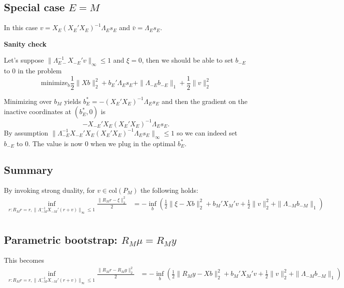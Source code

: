 \documentclass{article}
\begin{document}
          \subsection{          Special case $E=M$ }

          In this case $v=X_E(X_E'X_E)^{-1}\Lambda_Es_E$ and $\bar{v}=\Lambda_Es_E$.

          {\bf Sanity check}

          Let's suppose $\|\Lambda_{E-}^{-1}X_{-E}'v\|_{\infty} \leq 1$ and $\xi=0$, then we should be able to set $b_{-E}$ to 0 in the problem
          $$
          \text{minimize}_b \frac{1}{2} \|Xb\|^2_2 + b_E'\Lambda_Es_E + \|\Lambda_{-E}b_{-E}\|_1 + \frac{1}{2} \|v\|^2_2
          $$

          Minimizing over $b_M$ yields $b_E^* =-(X_E'X_E)^{-1}\Lambda_Es_E$ and then the gradient
          on the inactive coordinates at $(b_E^*, 0)$ is
          $$
          -X_{-E}'X_E(X_E'X_E)^{-1}\Lambda_Es_E.
          $$
          By assumption $\|\Lambda_{-E}^{-1}X_{-E}'X_E(X_E'X_E)^{-1}\Lambda_Es_E\|_{\infty} \leq 1$ so we can indeed set $b_{-E}$ to 0.
          The value is now 0 when we plug in the optimal $b_E^*$.

          \subsection{Summary}

          By invoking strong duality, for $v \in \text{col}(P_M)$ the following holds:
          $$
          \begin{aligned}
          \inf_{r: R_Mr=r,  \|\Lambda_{-M}^{-1}X_{-M}'(r + v)\|_{\infty}
            \leq 1} \frac{\|R_Mr - \xi\|^2_2}{2} &= -\inf_b \left(\frac{1}{2} \|\xi - Xb\|^2_2 + b_M'X_M'v + \frac{1}{2} \|v\|^2_2  + \|\Lambda_{-M}b_{-M}\|_1\right)\\
          \end{aligned}
          $$

          \subsection{Parametric bootstrap: $R_M\mu=R_My$}

          This becomes
          $$
          \begin{aligned}
          \inf_{r: R_Mr=r,  \|\Lambda_{-M}^{-1}X_{-M}'(r + v)\|_{\infty}
            \leq 1} \frac{\|R_Mr - R_My\|^2_2}{2} &= -\inf_b \left(\frac{1}{2} \|R_My - Xb\|^2_2 + b_M'X_M'v + \frac{1}{2} \|v\|^2_2  + \|\Lambda_{-M}b_{-M}\|_1\right)\\
          \end{aligned}
          $$
          
\end{document}
